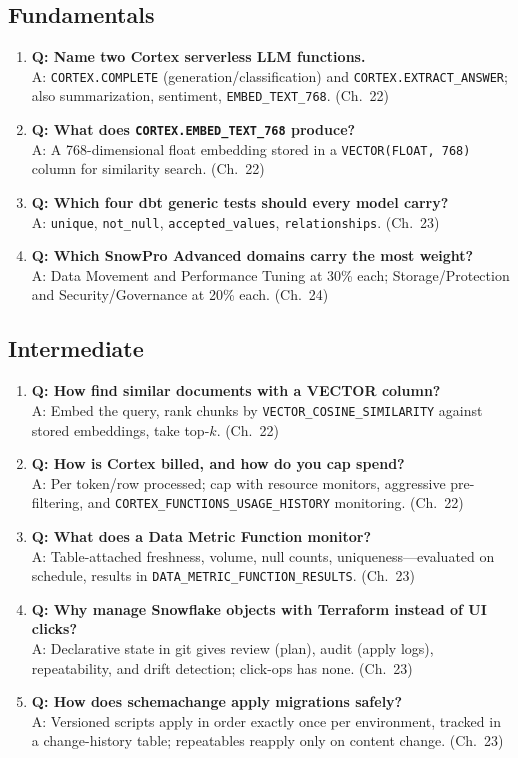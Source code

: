 \subsection{Fundamentals}
\begin{enumerate}
    \item \textbf{Q: Name two Cortex serverless LLM functions.}\\
    A: \texttt{CORTEX.COMPLETE} (generation/classification) and \texttt{CORTEX.EXTRACT\_ANSWER}; also summarization, sentiment, \texttt{EMBED\_TEXT\_768}. (Ch.~22)
    \item \textbf{Q: What does \texttt{CORTEX.EMBED\_TEXT\_768} produce?}\\
    A: A 768-dimensional float embedding stored in a \texttt{VECTOR(FLOAT, 768)} column for similarity search. (Ch.~22)
    \item \textbf{Q: Which four dbt generic tests should every model carry?}\\
    A: \texttt{unique}, \texttt{not\_null}, \texttt{accepted\_values}, \texttt{relationships}. (Ch.~23)
    \item \textbf{Q: Which SnowPro Advanced domains carry the most weight?}\\
    A: Data Movement and Performance Tuning at 30\% each; Storage/Protection and Security/Governance at 20\% each. (Ch.~24)
\end{enumerate}

\subsection{Intermediate}
\begin{enumerate}
    \item \textbf{Q: How find similar documents with a VECTOR column?}\\
    A: Embed the query, rank chunks by \texttt{VECTOR\_COSINE\_SIMILARITY} against stored embeddings, take top-$k$. (Ch.~22)
    \item \textbf{Q: How is Cortex billed, and how do you cap spend?}\\
    A: Per token/row processed; cap with resource monitors, aggressive pre-filtering, and \texttt{CORTEX\_FUNCTIONS\_USAGE\_HISTORY} monitoring. (Ch.~22)
    \item \textbf{Q: What does a Data Metric Function monitor?}\\
    A: Table-attached freshness, volume, null counts, uniqueness---evaluated on schedule, results in \texttt{DATA\_METRIC\_FUNCTION\_RESULTS}. (Ch.~23)
    \item \textbf{Q: Why manage Snowflake objects with Terraform instead of UI clicks?}\\
    A: Declarative state in git gives review (plan), audit (apply logs), repeatability, and drift detection; click-ops has none. (Ch.~23)
    \item \textbf{Q: How does schemachange apply migrations safely?}\\
    A: Versioned scripts apply in order exactly once per environment, tracked in a change-history table; repeatables reapply only on content change. (Ch.~23)
\end{enumerate}


